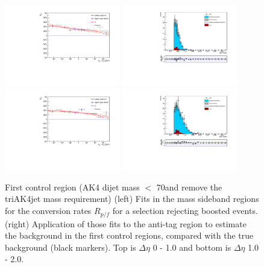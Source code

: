 \begin{figure}[h]
\centering
\includegraphics[width=0.45\textwidth]{F5/HH4b2p1SR_Fit_BG_boost_dEta0_CR1.pdf}
\includegraphics[width=0.45\textwidth]{F5/HH4b2p1_Plot_BG_boost_dEta0_CR1.pdf}\\
\includegraphics[width=0.45\textwidth]{F5/HH4b2p1SR_Fit_BG_boost_dEta1_CR1.pdf}
\includegraphics[width=0.45\textwidth]{F5/HH4b2p1_Plot_BG_boost_dEta1_CR1.pdf}
\caption{First control region (AK4 dijet mass $<$ 70\GeV and remove the triAK4jet mass requirement) (left) Fits in the mass sideband regions for the conversion rates $R_{p/f}$ for a selection rejecting boosted events.(right) Application of those fits to the anti-tag region to estimate the background in the first control regions, compared with the true background (black markers). Top is $\Delta\eta$ 0 - 1.0 and bottom is $\Delta\eta$ 1.0 - 2.0.}
\label{fig:closuredataboost}
\end{figure}

